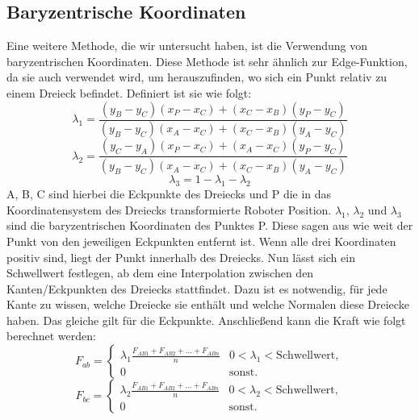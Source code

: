 \documentclass[conference]{IEEEtran}
\begin{document}
\subsection{Baryzentrische Koordinaten}
Eine weitere Methode, die wir untersucht haben, ist die Verwendung von baryzentrischen Koordinaten. Diese Methode ist sehr ähnlich zur Edge-Funktion, da sie auch verwendet wird, um herauszufinden, wo sich ein Punkt relativ zu einem Dreieck befindet. Definiert ist sie wie folgt:
\begin{equation*}
    \lambda_1 = \frac{(y_{B} - y_{C})(x_{P} - x_{C}) + (x_{C} - x_{B})(y_{P} - y_{C})}{(y_{B} - y_{C})(x_{A} - x_{C}) + (x_{C} - x_{B})(y_{A} - y_{C})}
\end{equation*}
\begin{equation}
    \lambda_2 = \frac{(y_{C} - y_{A})(x_{P} - x_{C}) + (x_{A} - x_{C})(y_{P} - y_{C})}{(y_{B} - y_{C})(x_{A} - x_{C}) + (x_{C} - x_{B})(y_{A} - y_{C})}
\end{equation}
\begin{equation*}
    \lambda_3 = 1 - \lambda_1 - \lambda_2
\end{equation*}
A, B, C sind hierbei die Eckpunkte des Dreiecks und P die in das Koordinatensystem des Dreiecks transformierte Roboter Position. $\lambda_1$, $\lambda_2$ und $\lambda_3$ sind die baryzentrischen Koordinaten des Punktes P. Diese sagen aus wie weit der Punkt von den jeweiligen Eckpunkten entfernt ist. Wenn alle drei Koordinaten positiv sind, liegt der Punkt innerhalb des Dreiecks. Nun lässt sich ein Schwellwert festlegen, ab dem eine Interpolation zwischen den Kanten/Eckpunkten des Dreiecks stattfindet. Dazu ist es notwendig, für jede Kante zu wissen, welche Dreiecke sie enthält und welche Normalen diese Dreiecke haben. Das gleiche gilt für die Eckpunkte. Anschließend kann die Kraft wie folgt berechnet werden:
\begin{equation*}
    F_{ab} = 
    \begin{cases} 
        \lambda_1 \frac{{ F_{AB1} + F_{AB2} + \ldots + F_{ABn}}}{n} &  0 < \lambda_1 < \text{Schwellwert}, \\
        0 & \text{sonst.}
    \end{cases}
\end{equation*}
\begin{equation*}
    F_{bc} =
    \begin{cases} 
        \lambda_2 \frac{{ F_{AB1} + F_{AB2} + \ldots + F_{ABn}}}{n} &  0 < \lambda_2 < \text{Schwellwert}, \\
        0 & \text{sonst.}
    \end{cases}
\end{equation*}
\end{document}
